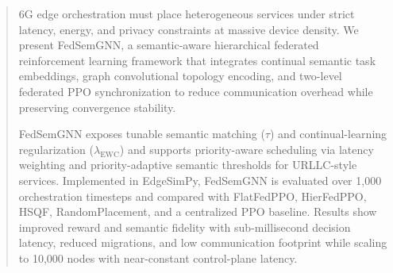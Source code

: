 \begin{abstract}
6G edge orchestration must place heterogeneous services under strict latency, energy, and privacy constraints at massive device density. We present FedSemGNN, a semantic-aware hierarchical federated reinforcement learning framework that integrates continual semantic task embeddings, graph convolutional topology encoding, and two-level federated PPO synchronization to reduce communication overhead while preserving convergence stability.

FedSemGNN exposes tunable semantic matching ($\tau$) and continual-learning regularization ($\lambda_{\mathrm{EWC}}$) and supports priority-aware scheduling via latency weighting and priority-adaptive semantic thresholds for URLLC-style services. Implemented in EdgeSimPy, FedSemGNN is evaluated over 1,000 orchestration timesteps and compared with FlatFedPPO, HierFedPPO, HSQF, RandomPlacement, and a centralized PPO baseline. Results show improved reward and semantic fidelity with sub-millisecond decision latency, reduced migrations, and low communication footprint while scaling to 10,000 nodes with near-constant control-plane latency.
\end{abstract}
